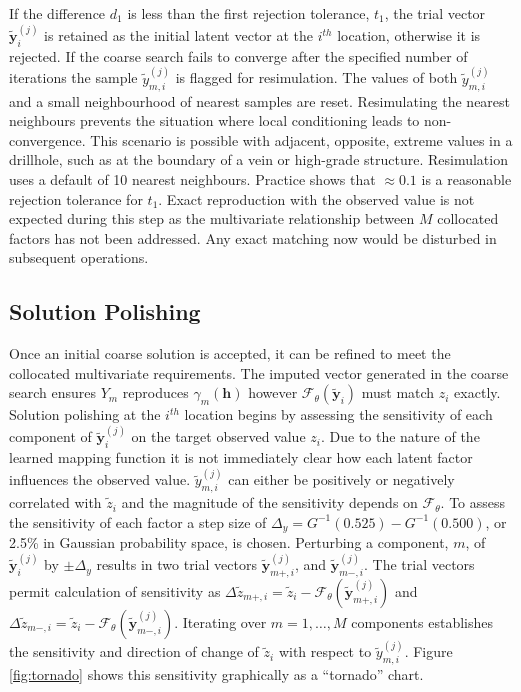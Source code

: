 If the difference $d_{1}$ is less than the first rejection tolerance, $t_{1}$, the trial vector $\tilde{\mathbf{y}}_{i}^{(j)}$ is retained as the initial latent vector at the $i^{th}$ location, otherwise it is rejected. If the coarse search fails to converge after the specified number of iterations the sample $\tilde{y}_{m, i}^{(j)}$ is flagged for resimulation. The values of both $\tilde{y}_{m, i}^{(j)}$ and a small neighbourhood of nearest samples are reset. Resimulating the nearest neighbours prevents the situation where local conditioning leads to non-convergence. This scenario is possible with adjacent, opposite, extreme values in a drillhole, such as at the boundary of a vein or high-grade structure. Resimulation uses a default of 10 nearest neighbours. Practice shows that $\approx 0.1$ is a reasonable rejection tolerance for $t_{1}$. Exact reproduction with the observed value is not expected during this step as the multivariate relationship between $M$ collocated factors has not been addressed. Any exact matching now would be disturbed in subsequent operations.


\subsection{Solution Polishing}
\label{subsec:polish}

Once an initial coarse solution is accepted, it can be refined to meet the collocated multivariate requirements. The imputed vector generated in the coarse search ensures $Y_{m}$ reproduces $\gamma_{m}(\mathbf{h})$ however $\mathcal{F}_{\theta}(\tilde{\mathbf{y}}_{i})$ must match $z_{i}$ exactly. Solution polishing at the $i^{th}$ location begins by assessing the sensitivity of each component of  $\tilde{\mathbf{y}}_{i}^{(j)}$ on the target observed value $z_{i}$. Due to the nature of the learned mapping function it is not immediately clear how each latent factor influences the observed value. $\tilde{y}_{m, i}^{(j)}$ can either be positively or negatively correlated with $\tilde{z}_{i}$ and the magnitude of the sensitivity depends on $\mathcal{F}_{\theta}$. To assess the sensitivity of each factor a step size of $\Delta_{y} = G^{-1}(0.525)-G^{-1}(0.500)$, or 2.5\% in Gaussian probability space, is chosen. Perturbing a component, $m$, of $\tilde{\mathbf{y}}^{(j)}_{i}$ by $\pm \Delta_{y}$ results in two trial vectors $\tilde{\mathbf{y}}_{m+, i}^{(j)}$, and $\tilde{\mathbf{y}}_{m-,i}^{(j)}$. The trial vectors permit calculation of sensitivity as  $\Delta\tilde{z}_{m+,i} = \tilde{z}_{i} - \mathcal{F}_{\theta}(\tilde{\mathbf{y}}_{m+, i}^{(j)})$ and $\Delta\tilde{z}_{m-,i} = \tilde{z}_{i} - \mathcal{F}_{\theta}(\tilde{\mathbf{y}}_{m-,i}^{(j)})$. Iterating over $m=1,\dots,M$ components establishes the sensitivity and direction of change of $\tilde{z}_{i}$ with respect to $\tilde{y}_{m, i}^{(j)}$. Figure \ref{fig:tornado} shows this sensitivity graphically as a ``tornado'' chart.

